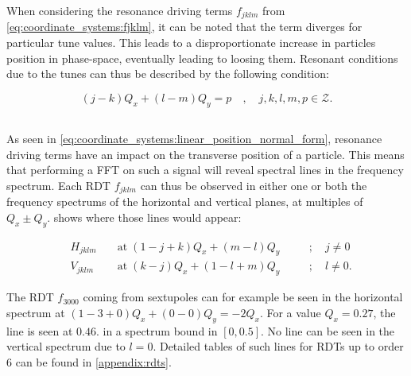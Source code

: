 

When considering the resonance driving terms $f_{jklm}$ from \cref{eq:coordinate_systems:fjklm}, it
can be noted that the term diverges for particular tune values. This leads to a disproportionate
increase in particles position in phase-space, eventually leading to loosing them.
Resonant conditions due to the tunes can thus be described by the following condition:

\begin{equation}
    (j-k)Q_x + (l-m)Q_y = p \quad,\quad j,k,l,m,p \in \mathcal{Z}.
\end{equation}
    


\subsection{}

As seen in \cref{eq:coordinate_systems:linear_position_normal_form}, resonance driving terms have an
impact on the transverse position of a particle. This means that performing a FFT on such a signal
will reveal spectral lines in the frequency spectrum.
Each RDT $f_{jklm}$ can thus be observed in either one or both the frequency spectrums of the
horizontal and vertical planes, at multiples of $Q_x \pm Q_y$. 
shows where those lines would appear:

\begin{equation}
    \begin{aligned}
    & H_{jklm} \;&&\text{at}\; (1 - j + k)Q_x + (m - l)Q_y \quad&&; \quad j \ne 0 \\
    & V_{jklm}   &&\text{at}\; (k - j)Q_x + (1 - l + m)Q_y      &&; \quad l \ne 0.
    \end{aligned}
    \label{eq:resonances:rdt_spectrum}
\end{equation}

The RDT $f_{3000}$ coming from sextupoles can for example be seen in the horizontal spectrum at
$(1-3+0)Q_x + (0-0)Q_y = -2Q_x$. For a value $Q_x = 0.27$, the line is seen at $0.46$. in a spectrum
bound in $[0, 0.5]$. No line can be seen in the vertical spectrum due to $l = 0$.
Detailed tables of such lines for RDTs up to order 6 can be found in \cref{appendix:rdts}.

